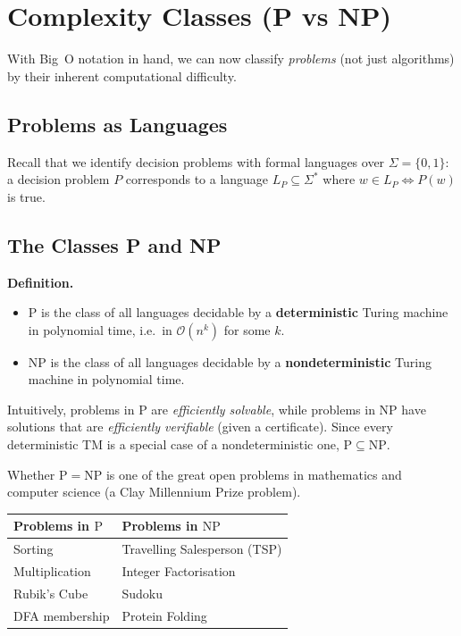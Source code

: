 \documentclass[11pt, a4paper]{article}
\theoremstyle{definition}
\theoremstyle{remark}
\begin{document}
\section{Complexity Classes (P vs NP)}

With Big~O notation in hand, we can now classify \emph{problems} (not just algorithms) by
their inherent computational difficulty.

\subsection{Problems as Languages}

Recall that we identify decision problems with formal languages over $\Sigma=\{0,1\}$: a
decision problem $P$ corresponds to a language $L_P\subseteq\Sigma^*$ where
$w\in L_P\iff P(w)$ is true.

\subsection{The Classes P and NP}

\begin{defbox}
\textbf{Definition.}
\begin{itemize}[itemsep=4pt]
  \item $\mathrm{P}$ is the class of all languages decidable by a \textbf{deterministic}
        Turing machine in polynomial time, i.e.\ in $\mathcal{O}(n^k)$ for some $k$.
  \item $\mathrm{NP}$ is the class of all languages decidable by a \textbf{nondeterministic}
        Turing machine in polynomial time.
\end{itemize}
\end{defbox}

Intuitively, problems in $\mathrm{P}$ are \emph{efficiently solvable}, while problems in
$\mathrm{NP}$ have solutions that are \emph{efficiently verifiable} (given a certificate).
Since every deterministic TM is a special case of a nondeterministic one,
$\mathrm{P}\subseteq\mathrm{NP}$.

Whether $\mathrm{P}=\mathrm{NP}$ is one of the great open problems in mathematics and
computer science (a Clay Millennium Prize problem).

\begin{center}
\begin{tabular}{ll}
  \toprule
  Problems in $\mathrm{P}$ & Problems in $\mathrm{NP}$ \\
  \midrule
  Sorting                   & Travelling Salesperson (TSP) \\
  Multiplication            & Integer Factorisation \\
  Rubik's Cube              & Sudoku \\
  DFA membership            & Protein Folding \\
  \bottomrule
\end{tabular}
\end{center}
\end{document}
